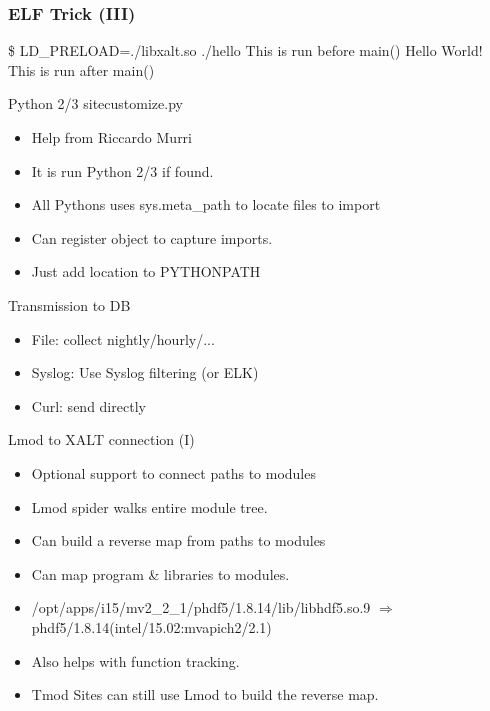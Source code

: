 \documentclass{beamer}
\begin{document}
\begin{frame}[fragile]
    \frametitle{ELF Trick (III)}
 {\small
    \begin{semiverbatim}
        \$ LD\_PRELOAD=./libxalt.so ./hello
        This is run before main()
        Hello World!
        This is run after main()
    \end{semiverbatim}
}
\end{frame}


\begin{frame}{Python 2/3 sitecustomize.py}
  \begin{itemize}
    \item Help from Riccardo Murri
    \item It is run Python 2/3 if found.
    \item All Pythons uses sys.meta_path to locate files to import
    \item Can register object to capture imports.
    \item Just add location to PYTHONPATH
  \end{itemize}
\end{frame}


\begin{frame}{Transmission to DB}
  \begin{itemize}
    \item File: collect nightly/hourly/...
    \item Syslog: Use Syslog filtering (or ELK)
    \item Curl: send directly 
  \end{itemize}
\end{frame}

\begin{frame}{Lmod to XALT connection (I)}
  \begin{itemize}
    \item Optional support to connect paths to modules
    \item Lmod spider walks entire module tree.
    \item Can build a reverse map from paths to modules
    \item Can map program \& libraries to modules.
    \item /opt/apps/i15/mv2\_2\_1/phdf5/1.8.14/lib/libhdf5.so.9
      $\Rightarrow$ phdf5/1.8.14(intel/15.02:mvapich2/2.1)
    \item Also helps with function tracking.
    \item Tmod Sites can still use Lmod to build the reverse map.
  \end{itemize}
\end{frame}
\end{document}
